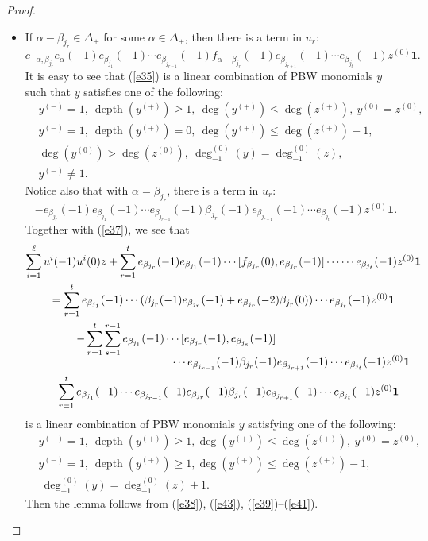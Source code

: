 \documentclass[JEP,XML,SOM,Unicode]{cedram}
\let\al\alpha
\let\be\beta
\DeclareMathOperator{\dep}{depth}
\theoremstyle{definition}
\begin{document}
\begin{proof}
\begin{itemize}
\item
If $\al-\be_{j_r}\in\Delta_+$ for some $\al\in\Delta_+$, then there is a term in $u_r$:
\begin{equation}\label{e35}
c_{-\al,\be_{j_r}}e_{\al}(-1)e_{\be_{j_1}}(-1) \cdots e_{\be_{j_{r-1}}}(-1) f_{\al-\be_{j_r}}(-1)e_{\be_{j_{r+1}}}(-1) \cdots e_{\be_{j_t}}(-1) z^{(0)} \mathbf{1}.
\end{equation}
It is easy to see that (\ref{e35}) is a linear combination of PBW monomials $y$ such that $y$ satisfies one of the following:
\begin{align}\label{e39}
& y^{(-)}=1, \ \dep(y^{(+)})\geq 1, \ \deg(y^{(+)})\leq \deg(z^{(+)}), \ y^{(0)}=z^{(0)},&\\
& y^{(-)}=1, \ \dep(y^{(+)})=0, \ \deg(y^{(+)})\leq \deg(z^{(+)})-1, &\\ \nonumber & \deg(y^{(0)})>\deg(z^{(0)}), \ \deg_{-1}^{(0)}(y)=\deg_{-1}^{(0)}(z),&\\
& y^{(-)}\neq 1.
\end{align}
Notice also that with $\al=\be_{j_r}$, there is a term in $u_r$:
\begin{equation*}
-e_{\be_{j_r}}(-1)e_{\be_{j_1}}(-1) \cdots e_{\be_{j_{r-1}}}(-1)
\be_{j_r}(-1)e_{\be_{j_{r+1}}}(-1) \cdots e_{\be_{j_t}}(-1) z^{(0)} \mathbf{1}.
\end{equation*}
Together with (\ref{e37}), we see that
\begin{multline*}
\sum_{i=1}^{\ell} u^i(-1)u^i(0) z+\sum_{r=1}^te_{\be_{j_r}}(-1)e_{\be_{j_1}}(-1)\cdots [f_{\be_{j_r}}(0), e_{\be_{j_r}}(-1)]\cdots \cdots e_{\be_{j_t}}(-1) z^{(0)} \mathbf{1}\\
= \sum_{r=1}^t
e_{\be_{j_1}}(-1) \cdots (\be_{j_r}(-1) e_{\be_{j_r}}(-1) + e_{\be_{j_r}}(-2) \be_{j_r}(0)) \cdots e_{\be_{j_t}}(-1) z^{(0)} \mathbf{1}\\
\hspace*{-3cm}-\sum_{r=1}^t\sum_{s=1}^{r-1}e_{\be_{j_1}}(-1) \cdots [e_{\be_{j_r}}(-1), e_{\be_{j_s}}(-1)]\\[-5pt]
\shoveright{\cdots e_{\be_{j_{r-1}}}(-1)\be_{j_r}(-1)e_{\be_{j_{r+1}}}(-1) \cdots e_{\be_{j_t}}(-1) z^{(0)} \mathbf{1}}\\
-\sum_{r=1}^te_{\be_{j_1}}(-1) \cdots e_{\be_{j_{r-1}}}(-1)e_{\be_{j_r}}(-1)\be_{j_r}(-1)e_{\be_{j_{r+1}}}(-1) \cdots e_{\be_{j_t}}(-1) z^{(0)} \mathbf{1}
\end{multline*}
is a linear combination of PBW monomials $y$ satisfying one of the following:
\begin{align}
\label{e40}
& y^{(-)}=1, \ \dep(y^{(+)})\geq 1, \deg(y^{(+)})\leq \deg(z^{(+)}), \ y^{(0)}=z^{(0)}, \\\label{e41}
& y^{(-)}=1, \ \dep(y^{(+)})\geq 1, \deg(y^{(+)})\leq \deg(z^{(+)})-1, \\
& \ \deg_{-1}^{(0)}(y)=\deg_{-1}^{(0)}(z)+1. \nonumber
\end{align}
Then the lemma follows from (\ref{e38}), (\ref{e43}), (\ref{e39})--(\ref{e41}).\qedhere
\end{itemize}
\end{proof}
\end{document}
